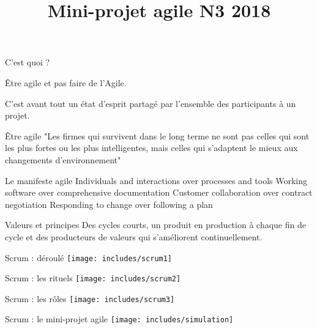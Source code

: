 \documentclass{beamer}
\title{Mini-projet agile N3 2018}
\author{
}
\date{}
\begin{document}
\frame{\titlepage}


\begin{frame}{C'est quoi ?}
 
  {\Large \alert{Être agile} et pas faire de l'Agile.}

  \vspace{6mm}
  C'est avant tout un état d'esprit partagé par l'ensemble des participants à un projet.
\end{frame}

\begin{frame}{Être agile}
  "Les firmes qui survivent dans le long terme ne sont pas celles qui sont les plus fortes ou les plus intelligentes, mais celles qui s'adaptent le mieux aux changements d'environnement"


\end{frame}

\begin{frame}{Le manifeste agile}
  \large
  \alert{Individuals and interactions} over processes and tools\newline
  \alert{Working software} over comprehensive documentation\newline
  \alert{Customer collaboration} over contract negotiation\newline
  \alert{Responding to change} over following a plan
\end{frame}

\begin{frame}{Valeurs et principes}
  \Large Des cycles courts, un produit en production à chaque fin de cycle et des producteurs de valeurs qui s'améliorent continuellement.
\end{frame}

\begin{frame}{Scrum : déroulé}
  \center
  \texttt{[image: includes/scrum1]}
\end{frame}

\begin{frame}{Scrum : les rituels}
  \center
  \texttt{[image: includes/scrum2]}
\end{frame}

\begin{frame}{Scrum : les rôles}
  \center
  \texttt{[image: includes/scrum3]}
\end{frame}

\begin{frame}{Scrum : le mini-projet agile}
  \center
  \texttt{[image: includes/simulation]}
\end{frame}
\end{document}
